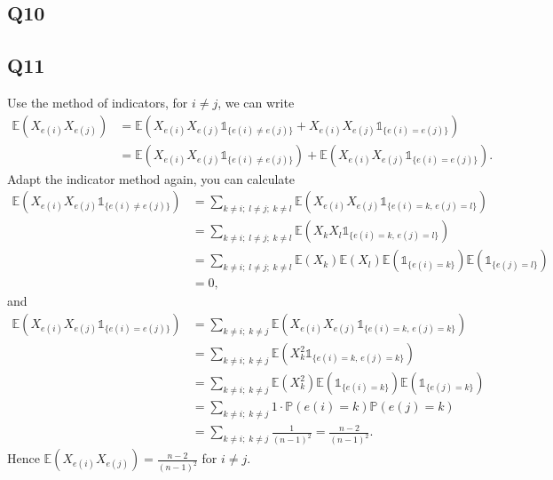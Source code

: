 \documentclass[12pt]{article}
\begin{document}
\subsection*{Q10}
\subsection*{Q11}
Use the method of indicators, for $i\neq j$, we can write 
\begin{equation*}
\begin{aligned}
\mathbb{E}(X_{e(i)}X_{e(j)}) &= \mathbb{E}(X_{e(i)}X_{e(j)}\mathds{1}_{\{e(i)\neq e(j)\}}+X_{e(i)}X_{e(j)}\mathds{1}_{\{e(i)= e(j)\}}) \\&
=\mathbb{E}(X_{e(i)}X_{e(j)}\mathds{1}_{\{e(i)\neq e(j)\}})+\mathbb{E}(X_{e(i)}X_{e(j)}\mathds{1}_{\{e(i)= e(j)\}}).
\end{aligned}
\end{equation*}
Adapt the indicator method again, you can calculate
\begin{equation*}
\begin{aligned}
\mathbb{E}(X_{e(i)}X_{e(j)}\mathds{1}_{\{e(i)\neq e(j)\}}) &= \sum_{k\neq i;\;l\neq j;\; k\neq l}\mathbb{E}(X_{e(i)}X_{e(j)}\mathds{1}_{\{e(i)=k,\,e(j)=l\}}) \\&
=\sum_{k\neq i;\;l\neq j;\; k\neq l}\mathbb{E}(X_k X_l\mathds{1}_{\{e(i)=k,\,e(j)=l\}}) \\&
=\sum_{k\neq i;\;l\neq j;\; k\neq l}\mathbb{E}(X_k)\mathbb{E}(X_l)\mathbb{E}(\mathds{1}_{\{e(i)=k\}})\mathbb{E}(\mathds{1}_{\{e(j)=l\}}) \\&
=0,
\end{aligned}
\end{equation*}
and
\begin{equation*}
\begin{aligned}
\mathbb{E}(X_{e(i)}X_{e(j)}\mathds{1}_{\{e(i)=e(j)\}}) &= \sum_{k\neq i;\;k\neq j}\mathbb{E}(X_{e(i)}X_{e(j)}\mathds{1}_{\{e(i)=k,\,e(j)=k\}}) \\&
=\sum_{k\neq i;\;k\neq j}\mathbb{E}(X_k^2\mathds{1}_{\{e(i)=k,\,e(j)=k\}}) \\&
=\sum_{k\neq i;\;k\neq j}\mathbb{E}(X_k^2)\mathbb{E}(\mathds{1}_{\{e(i)=k\}})\mathbb{E}(\mathds{1}_{\{e(j)=k\}}) \\&
=\sum_{k\neq i;\;k\neq j}1\cdot\mathbb{P}(e(i)=k)\mathbb{P}(e(j)=k) \\&
=\sum_{k\neq i;\;k\neq j}\frac{1}{(n-1)^2} = \frac{n-2}{(n-1)^2}.
\end{aligned}
\end{equation*}
Hence $\mathbb{E}(X_{e(i)}X_{e(j)})=\frac{n-2}{(n-1)^2}$ for $i\neq j$.
\end{document}
